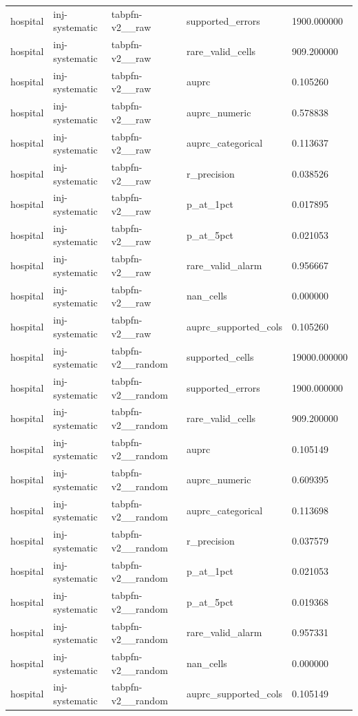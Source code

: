 \begin{tabular}{lllll}
hospital & inj-systematic & tabpfn-v2\_\_raw & supported\_errors & 1900.000000 \\
hospital & inj-systematic & tabpfn-v2\_\_raw & rare\_valid\_cells & 909.200000 \\
hospital & inj-systematic & tabpfn-v2\_\_raw & auprc & 0.105260 \\
hospital & inj-systematic & tabpfn-v2\_\_raw & auprc\_numeric & 0.578838 \\
hospital & inj-systematic & tabpfn-v2\_\_raw & auprc\_categorical & 0.113637 \\
hospital & inj-systematic & tabpfn-v2\_\_raw & r\_precision & 0.038526 \\
hospital & inj-systematic & tabpfn-v2\_\_raw & p\_at\_1pct & 0.017895 \\
hospital & inj-systematic & tabpfn-v2\_\_raw & p\_at\_5pct & 0.021053 \\
hospital & inj-systematic & tabpfn-v2\_\_raw & rare\_valid\_alarm & 0.956667 \\
hospital & inj-systematic & tabpfn-v2\_\_raw & nan\_cells & 0.000000 \\
hospital & inj-systematic & tabpfn-v2\_\_raw & auprc\_supported\_cols & 0.105260 \\
hospital & inj-systematic & tabpfn-v2\_\_random & supported\_cells & 19000.000000 \\
hospital & inj-systematic & tabpfn-v2\_\_random & supported\_errors & 1900.000000 \\
hospital & inj-systematic & tabpfn-v2\_\_random & rare\_valid\_cells & 909.200000 \\
hospital & inj-systematic & tabpfn-v2\_\_random & auprc & 0.105149 \\
hospital & inj-systematic & tabpfn-v2\_\_random & auprc\_numeric & 0.609395 \\
hospital & inj-systematic & tabpfn-v2\_\_random & auprc\_categorical & 0.113698 \\
hospital & inj-systematic & tabpfn-v2\_\_random & r\_precision & 0.037579 \\
hospital & inj-systematic & tabpfn-v2\_\_random & p\_at\_1pct & 0.021053 \\
hospital & inj-systematic & tabpfn-v2\_\_random & p\_at\_5pct & 0.019368 \\
hospital & inj-systematic & tabpfn-v2\_\_random & rare\_valid\_alarm & 0.957331 \\
hospital & inj-systematic & tabpfn-v2\_\_random & nan\_cells & 0.000000 \\
hospital & inj-systematic & tabpfn-v2\_\_random & auprc\_supported\_cols & 0.105149 \\

\end{tabular}

